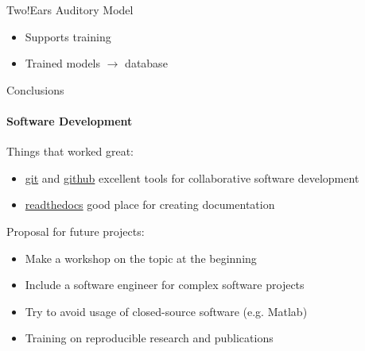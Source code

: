 \documentclass{beamer}
\begin{document}
\begin{frame}{Two!Ears Auditory Model}
\begin{minipage}[b]{0.56\columnwidth}
        \begin{itemize}
            \item Supports training
            \item Trained models $\rightarrow$ database
        \end{itemize}

    \end{minipage}

\end{frame}

\begin{frame}{Conclusions}
\framesubtitle{Software Development}

    Things that worked great:
    \begin{itemize}
        \item \href{https://git-scm.com}{git} and
            \href{https://github.com}{github} excellent tools for collaborative
            software development
        \item \href{https://readthedocs.org}{readthedocs} good place for
            creating documentation
    \end{itemize}

    \vspace{0.6cm}

    Proposal for future projects:
    \begin{itemize}
        \item Make a workshop on the topic at the beginning
        \item Include a software engineer for complex software projects
        \item Try to avoid usage of closed-source software (e.g. Matlab)
        \item Training on reproducible research and publications
    \end{itemize}

\end{frame}
\end{document}
